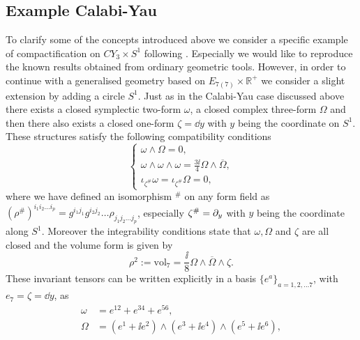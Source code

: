 

\subsection{Example Calabi-Yau}
To clarify some of the concepts introduced above we consider a specific example of compactification on $CY_3\times S^1$ following \cite{Ashmore:2015joa}. Especially we would like to reproduce the known results obtained from ordinary geometric tools. However, in order to continue with a generalised geometry based on $E_{7(7)}\times \mathbb{R}^+$ we consider a slight extension by adding a circle $S^1$. Just as in the Calabi-Yau case discussed above there exists a closed symplectic two-form $\omega$, a closed complex three-form $\Omega$ and then there also exists a closed one-form $\zeta=\dd y$ with $y$ being the coordinate on $S^1$. These structures satisfy the following compatibility conditions 
\begin{equation}
    \begin{cases}
        \omega\wedge\Omega = 0,\\
        \omega\wedge\omega\wedge\omega = \frac{3\ii}{4}\Omega\wedge\overbar{\Omega},\\
        \iota_{\zeta^{\#}}\omega = \iota_{\zeta^{\#}}\Omega = 0,
    \end{cases}
\end{equation}
where we have defined an isomorphism $^{\#}$ on any form field as $(\rho^{\#})^{i_1i_2\ldots i_p}=g^{i_1j_1}g^{i_2j_2}\ldots\rho_{j_1j_2\ldots j_p}$, especially $\zeta^{\#}=\partial_y$ with $y$ being the coordinate along $S^1$. Moreover the integrability conditions state that $\omega,\Omega$ and $\zeta$ are all closed and the volume form is given by 
\begin{equation}
    \rho^2 := \text{vol}_7 = \frac{\ii}{8}\Omega\wedge\overbar{\Omega}\wedge \zeta. 
\end{equation}
These invariant tensors can be written explicitly in a basis $\{e^a\}_{a=1,2,\ldots 7}$, with $e_7=\zeta=\dd y$, as 
\begin{equation}
    \begin{aligned}\label{eq:Frame}
        \omega &= e^{12}+e^{34}+e^{56},\\
        \Omega &= (e^1+\ii e^{2})\wedge(e^3+\ii e^{4})\wedge(e^5+\ii e^{6}),
    \end{aligned}
\end{equation}
